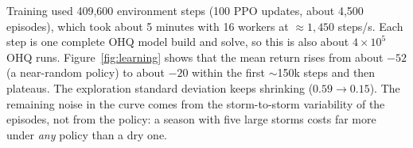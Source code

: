Training used 409{,}600 environment steps (100 PPO updates, about 4{,}500
episodes), which took about 5 minutes with 16 workers at
$\approx1{,}450$ steps/s. Each step is one complete OHQ model build and solve,
so this is also about $4\times10^5$ OHQ runs.
Figure~\ref{fig:learning} shows that the mean return rises from about $-52$
(a near-random policy) to about $-20$ within the first $\sim$150k steps and
then plateaus. The exploration standard deviation keeps shrinking
($0.59\to0.15$). The remaining noise in the curve comes from the
storm-to-storm variability of the episodes, not from the policy: a season
with five large storms costs far more under \emph{any} policy than a dry
one.

